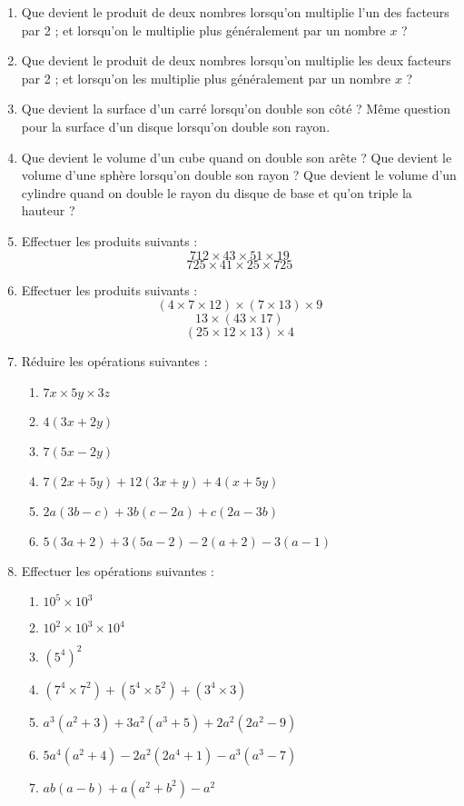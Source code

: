 \documentclass[12 pt]{extarticle}
\theoremstyle{plain}
\begin{document}
\begin{enumerate}
\item Que devient le produit de deux nombres lorsqu'on
multiplie l'un des facteurs par 2 ; et lorsqu'on le multiplie plus généralement par un nombre $x$ ? 
\item Que devient le produit de deux nombres lorsqu'on
multiplie les deux facteurs par 2 ; et lorsqu'on les 
multiplie plus généralement par un nombre $x$ ?
\item Que devient la surface d'un carré lorsqu'on 
double son côté ? Même question pour la surface d'un
disque lorsqu'on double son rayon. 
\item Que devient le volume d'un cube quand on double
son arête ? Que devient le volume d'une sphère lorsqu'on double son rayon ? Que devient le volume d'un cylindre quand on double le rayon du disque de base et qu'on triple la hauteur ? 
\item Effectuer les produits suivants : 
\[ 712 \times 43 \times 51 \times 19\]
\[725 \times 41 \times 25 \times 725\]
\item Effectuer les produits suivants : 
\[ (4 \times 7 \times 12) \times (7 \times 13) \times 9\]
\[ 13 \times (43 \times 17)\]
\[ (25 \times 12 \times 13) \times 4\]
\item Réduire les opérations suivantes : 
\begin{enumerate}
\item $7x \times 5y \times 3z$
\item $4(3x + 2y)$
\item $7(5x - 2y)$
\item $7(2x + 5y) + 12(3x + y) + 4(x + 5y)$
\item $2a(3b - c) + 3b(c - 2a) + c(2a -3b)$
\item $5(3a + 2) + 3(5a -2) - 2(a + 2) - 3(a - 1)$
\end{enumerate}
\item Effectuer les opérations suivantes : 
\begin{enumerate}
\item $10^5\times 10^3$
\item $10^2\times 10^3 \times 10^4$
\item $(5^4)^2$
\item $(7^4 \times 7^2) + (5^4 \times 5^2) + 
(3^4 \times 3)$
\item $a^3(a^2 + 3) + 3a^2(a^3 + 5) + 2a^2( 2a^2 - 9)$
\item $5a^4(a^2 + 4) - 2a^2(2a^4 + 1) - a^3(a^3 - 7)$
\item $ab(a - b) + a(a^2 + b^2) - a^2$

\end{enumerate}
\end{enumerate}
\end{document}
